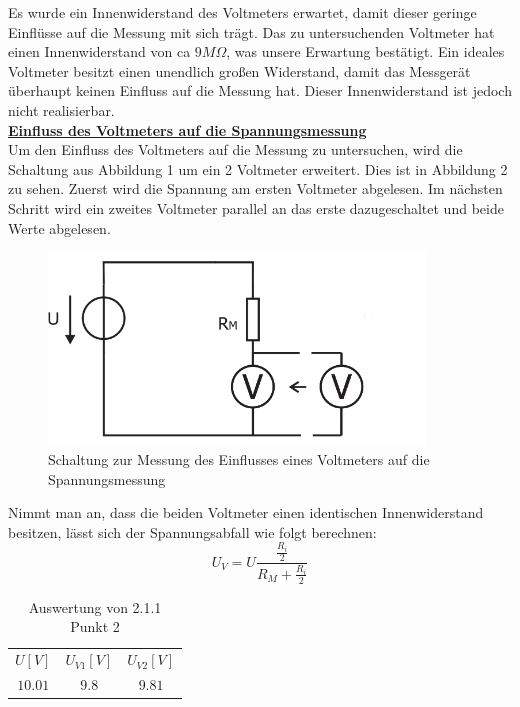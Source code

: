\documentclass[a4paper,12pt]{article}
\begin{document}
	\noindent
	Es wurde ein Innenwiderstand des Voltmeters erwartet, damit dieser geringe Einflüsse auf die Messung mit sich trägt. Das zu untersuchenden Voltmeter hat einen Innenwiderstand von ca $9M\Omega$, was unsere Erwartung bestätigt. Ein ideales Voltmeter besitzt einen unendlich großen Widerstand, damit das Messgerät überhaupt keinen Einfluss auf die Messung hat. Dieser Innenwiderstand ist jedoch nicht realisierbar. \\
	
	\noindent
	\underline{\textbf{Einfluss des Voltmeters auf die Spannungsmessung}} \\ \newline
	\noindent
	Um den Einfluss des Voltmeters auf die Messung zu untersuchen, wird die Schaltung aus Abbildung 1 um ein 2 Voltmeter erweitert. Dies ist in Abbildung 2 zu sehen. Zuerst wird die Spannung am ersten Voltmeter abgelesen. Im nächsten Schritt wird ein zweites Voltmeter parallel an das erste dazugeschaltet und beide Werte abgelesen.
	\begin{figure}[h]
		\centering
		\includegraphics[width=10cm]{img/Einfluss_Voltmeter}
		\caption{Schaltung zur Messung des Einflusses eines Voltmeters auf die Spannungsmessung}
	\end{figure}
	\newline
	Nimmt man an, dass die beiden Voltmeter einen identischen Innenwiderstand besitzen, lässt sich der Spannungsabfall wie folgt berechnen:
	\[
		U_V = U \frac{\frac{R_i}{2}}{R_M + \frac{R_i}{2}}
	\]
	\begin{table}[h]
		\centering
		\begin{tabular}{|c|c|c|}
			\hline
			\multirow{2}{*}{$U[V]$} & \multirow{2}{*}{$U_{V1}[V]$} & \multirow{2}{*}{$U_{V2}[V]$} \\
			&  &  \\ \hline
			\multirow{2}{*}{$10.01$} & \multirow{2}{*}{$9.8$} & \multirow{2}{*}{$9.81$} \\
			&  &  \\ \hline
		\end{tabular}
		\caption{Auswertung von 2.1.1 Punkt 2}
	\end{table}
\end{document}
